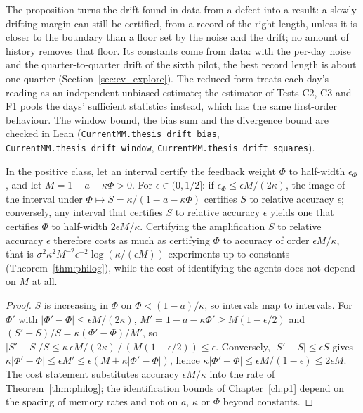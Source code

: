 The proposition turns the drift found in data from a defect into a result: a slowly drifting margin can still be certified, from a record of the right length, unless it is closer to the boundary than a floor set by the noise and the drift; no amount of history removes that floor. Its constants come from data: with the per-day noise and the quarter-to-quarter drift of the sixth pilot, the best record length is about one quarter (Section~\ref{sec:ev_explore}). The reduced form treats each day's reading as an independent unbiased estimate; the estimator of Tests C2, C3 and F1 pools the days' sufficient statistics instead, which has the same first-order behaviour. The window bound, the bias sum and the divergence bound are checked in Lean (\nolinkurl{CurrentMM.thesis_drift_bias}, \nolinkurl{CurrentMM.thesis_drift_window}, \nolinkurl{CurrentMM.thesis_drift_squares}).

\begin{corollary}\label{cor:loopmargin}
In the positive class, let an interval certify the feedback weight $\Phi$ to half-width $\epsilon_\Phi$, and let $M=1-a-\kappa\Phi>0$. For $\epsilon\in(0,1/2]$: if $\epsilon_\Phi\le\epsilon M/(2\kappa)$, the image of the interval under $\Phi\mapsto S=\kappa/(1-a-\kappa\Phi)$ certifies $S$ to relative accuracy $\epsilon$; conversely, any interval that certifies $S$ to relative accuracy $\epsilon$ yields one that certifies $\Phi$ to half-width $2\epsilon M/\kappa$. Certifying the amplification $S$ to relative accuracy $\epsilon$ therefore costs as much as certifying $\Phi$ to accuracy of order $\epsilon M/\kappa$, that is $\sigma^2\kappa^2M^{-2}\epsilon^{-2}\log(\kappa/(\epsilon M))$ experiments up to constants (Theorem~\ref{thm:philog}), while the cost of identifying the agents does not depend on $M$ at all.
\hfill\Proved
\end{corollary}

\begin{proof}
$S$ is increasing in $\Phi$ on $\Phi<(1-a)/\kappa$, so intervals map to intervals. For $\Phi'$ with $|\Phi'-\Phi|\le\epsilon M/(2\kappa)$, $M'=1-a-\kappa\Phi'\ge M(1-\epsilon/2)$ and $(S'-S)/S=\kappa(\Phi'-\Phi)/M'$, so $|S'-S|/S\le\kappa\,\epsilon M/(2\kappa)\,/\,(M(1-\epsilon/2))\le\epsilon$. Conversely, $|S'-S|\le\epsilon S$ gives $\kappa|\Phi'-\Phi|\le\epsilon M'\le\epsilon(M+\kappa|\Phi'-\Phi|)$, hence $\kappa|\Phi'-\Phi|\le\epsilon M/(1-\epsilon)\le2\epsilon M$. The cost statement substitutes accuracy $\epsilon M/\kappa$ into the rate of Theorem~\ref{thm:philog}; the identification bounds of Chapter~\ref{ch:p1} depend on the spacing of memory rates and not on $a$, $\kappa$ or $\Phi$ beyond constants.
\end{proof}

